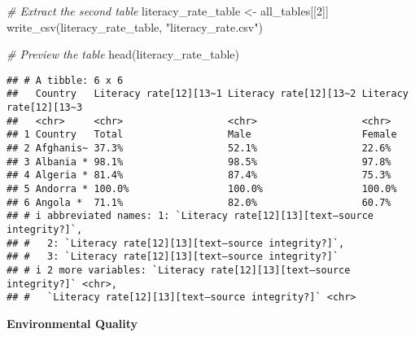 \documentclass[
]{article}
\newenvironment{Shaded}{\begin{snugshade}}{\end{snugshade}}
\newcommand{\CommentTok}[1]{\textcolor[rgb]{0.56,0.35,0.01}{\textit{#1}}}
\newcommand{\DecValTok}[1]{\textcolor[rgb]{0.00,0.00,0.81}{#1}}
\newcommand{\FunctionTok}[1]{\textcolor[rgb]{0.00,0.00,0.00}{#1}}
\newcommand{\NormalTok}[1]{#1}
\newcommand{\OtherTok}[1]{\textcolor[rgb]{0.56,0.35,0.01}{#1}}
\newcommand{\StringTok}[1]{\textcolor[rgb]{0.31,0.60,0.02}{#1}}
\begin{document}
\begin{Shaded}
\begin{Highlighting}[]
\CommentTok{\# Extract the second table }
\NormalTok{literacy\_rate\_table }\OtherTok{\textless{}{-}}\NormalTok{ all\_tables[[}\DecValTok{2}\NormalTok{]]}
\FunctionTok{write\_csv}\NormalTok{(literacy\_rate\_table, }\StringTok{"literacy\_rate.csv"}\NormalTok{)}

\CommentTok{\# Preview the table}
\FunctionTok{head}\NormalTok{(literacy\_rate\_table)}
\end{Highlighting}
\end{Shaded}

\begin{verbatim}
## # A tibble: 6 x 6
##   Country   Literacy rate[12][13~1 Literacy rate[12][13~2 Literacy rate[12][13~3
##   <chr>     <chr>                  <chr>                  <chr>                 
## 1 Country   Total                  Male                   Female                
## 2 Afghanis~ 37.3%                  52.1%                  22.6%                 
## 3 Albania * 98.1%                  98.5%                  97.8%                 
## 4 Algeria * 81.4%                  87.4%                  75.3%                 
## 5 Andorra * 100.0%                 100.0%                 100.0%                
## 6 Angola *  71.1%                  82.0%                  60.7%                 
## # i abbreviated names: 1: `Literacy rate[12][13][text–source integrity?]`,
## #   2: `Literacy rate[12][13][text–source integrity?]`,
## #   3: `Literacy rate[12][13][text–source integrity?]`
## # i 2 more variables: `Literacy rate[12][13][text–source integrity?]` <chr>,
## #   `Literacy rate[12][13][text–source integrity?]` <chr>
\end{verbatim}

\textbf{Environmental Quality}
\end{document}
